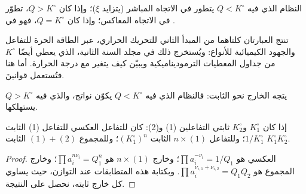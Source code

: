 \begin{proposition}\label{prop:b1:extent-q-and-k:direction}
النظام الذي فيه $Q < K^\circ$ يتطور في الاتجاه المباشر (يتزايد
$\xi$)؛ وإذا كان $Q > K^\circ$، تطوّر في الاتجاه المعاكس؛ وإذا كان
$Q = K^\circ$، فهو في .
\end{proposition}
\admitted

\begin{remark}\label{rem:b1:extent-q-and-k:origin}
تنتج العبارتان كلتاهما من المبدأ الثاني للتحريك الحراري، عبر
الطاقة الحرة للتفاعل والجهود الكيميائية للأنواع: ويُستخرج ذلك
في مجلد السنة الثانية، الذي يعطي أيضًا $K^\circ$ من جداول
المعطيات الترموديناميكية ويبيّن كيف يتغير مع درجة الحرارة. أما هنا
فتُستعمل قوانينَ.
\end{remark}

\begin{omfigure}

{\small يتجه الخارج نحو الثابت: فالنظام الذي فيه $Q <
K^\circ$ يكوّن نواتج، والذي فيه $Q > K^\circ$ يستهلكها.}
\end{omfigure}

\begin{proposition}\label{prop:b1:extent-q-and-k:combine-k}
إذا كان $K_1^\circ$ و$K_2^\circ$ ثابتي التفاعلين (1) و(2): كان
للتفاعل العكسي للتفاعل (1) الثابت $1/K_1^\circ$؛ وللتفاعل $n \times
(1)$ الثابت $(K_1^\circ)^n$؛ وللمجموع $(1) + (2)$ الثابت $K_1^\circ K_2^\circ$.
\end{proposition}

\begin{proof}
 العكسي هو $\prod a_i^{-\nu_i} = 1/Q_1$؛ وخارج
$n \times (1)$ هو $\prod a_i^{n\nu_i} = Q_1^n$؛ وخارج المجموع هو
$\prod a_i^{\nu_{i,1} + \nu_{i,2}} = Q_1 Q_2$. وبكتابة هذه المتطابقات عند
التوازن، حيث يساوي كل خارج ثابته، نحصل على النتيجة.
\end{proof}

